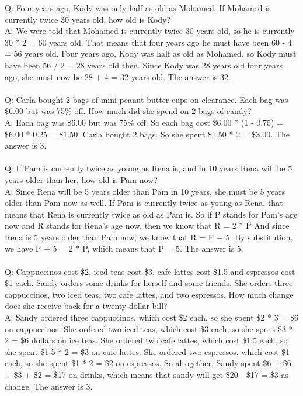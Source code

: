 Q: Four years ago, Kody was only half as old as Mohamed. If Mohamed is currently twice 30 years old, how old is Kody? \\
A: We were told that Mohamed is currently twice 30 years old, so he is currently 30 * 2 = 60 years old. That means that four years ago he must have been 60 - 4 = 56 years old. Four years ago, Kody was half as old as Mohamed, so Kody must have been 56 / 2 = 28 years old then. Since Kody was 28 years old four years ago, she must now be 28 + 4 = 32 years old. The answer is 32. \\
 \\
Q: Carla bought 2 bags of mini peanut butter cups on clearance. Each bag was \$6.00 but was 75\% off. How much did she spend on 2 bags of candy? \\
A: Each bag was \$6.00 but was 75\% off. So each bag cost \$6.00 * (1 - 0.75) = \$6.00 * 0.25 = \$1.50. Carla bought 2 bags. So she spent \$1.50 * 2 = \$3.00. The answer is 3. \\
 \\
Q: If Pam is currently twice as young as Rena is, and in 10 years Rena will be 5 years older than her, how old is Pam now? \\
A: Since Rena will be 5 years older than Pam in 10 years, she must be 5 years older than Pam now as well. If Pam is currently twice as young as Rena, that means that Rena is currently twice as old as Pam is. So if P stands for Pam's age now and R stands for Rena's age now, then we know that R = 2 * P And since Rena is 5 years older than Pam now, we know that R = P + 5. By substitution, we have P + 5 = 2 * P, which means that P = 5. The answer is 5. \\
 \\
Q: Cappuccinos cost \$2, iced teas cost \$3, cafe lattes cost \$1.5 and espressos cost \$1 each. Sandy orders some drinks for herself and some friends. She orders three cappuccinos, two iced teas, two cafe lattes, and two espressos. How much change does she receive back for a twenty-dollar bill? \\
A: Sandy ordered three cappuccinos, which cost \$2 each, so she spent \$2 * 3 = \$6 on cappuccinos. She ordered two iced teas, which cost \$3 each, so she spent \$3 * 2 = \$6 dollars on ice teas. She ordered two cafe lattes, which cost \$1.5 each, so she spent \$1.5 * 2 = \$3 on cafe lattes. She ordered two espressos, which cost \$1 each, so she spent \$1 * 2 = \$2 on espressos. So altogether, Sandy spent \$6 + \$6 + \$3 + \$2 = \$17 on drinks, which means that sandy will get \$20 - \$17 = \$3 as change. The answer is 3. \\

